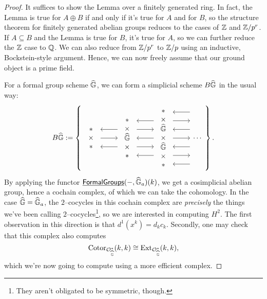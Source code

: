 \begin{proof}
It suffices to show the Lemma over a finitely generated ring.  In fact, the Lemma is true for $A \oplus B$ if and only if it's true for $A$ and for $B$, so the structure theorem for finitely generated abelian groups reduces to the cases of $\mathbb Z$ and $\mathbb Z/p^r$.  If $A \subseteq B$ and the Lemma is true for $B$, it's true for $A$, so we can further reduce the $\mathbb Z$ case to $\mathbb{Q}$.  We can also reduce from $\mathbb Z/p^r$ to $\mathbb Z/p$ using an inductive, Bockstein-style argument.  Hence, we can now freely assume that our ground object is a prime field.

For a formal group scheme $\widehat{\mathbb G}$, we can form a simplicial scheme $B\widehat{\mathbb G}$ in the usual way:
\[B\G := \left\{
\begin{tikzcd}[ampersand replacement=\&]
\begin{array}{c} * \\ \times \\ * \end{array} \arrow{r} \arrow[leftarrow,shift left=\baselineskip]{r} \arrow[leftarrow,shift right=\baselineskip]{r} \&
\begin{array}{c} * \\ \times \\ \G \\ \times \\ * \end{array} \arrow[leftarrow, shift left=(2*\baselineskip)]{r} \arrow[shift left=\baselineskip]{r} \arrow[leftarrow]{r} \arrow[shift right=\baselineskip]{r} \arrow[leftarrow, shift right=(2*\baselineskip)]{r} \&
\begin{array}{c} * \\ \times \\ \G \\ \times \\ \G \\ \times \\ *\end{array} \arrow[leftarrow, shift left=(3*\baselineskip)]{r} \arrow[shift left=(2*\baselineskip)]{r} \arrow[leftarrow, shift left=\baselineskip]{r} \arrow{r} \arrow[leftarrow, shift right=\baselineskip]{r} \arrow[shift right=(2*\baselineskip)]{r} \arrow[leftarrow, shift right=(3*\baselineskip)]{r} \&
\cdots
\end{tikzcd}
\right\}.\]
By applying the functor $\operatorname{\underline{\smash{\mathsf{FormalGroups}}}}(-, \widehat{\mathbb G}_a)(k)$, we get a cosimplicial abelian group, hence a cochain complex, of which we can take the cohomology.  In the case $\widehat{\mathbb G} = \widehat{\mathbb G}_a$, the $2$--cocycles in this cochain complex are \emph{precisely} the things we've been calling $2$--cocycles\footnote{They aren't obligated to be symmetric, though.}, so we are interested in computing $H^2$.  The first observation in this direction is that $d^1(x^k) = d_k c_k$.  Secondly, one may check that this complex also computes \[\operatorname{Cotor}_{\mathcal{O}_{\widehat{\mathbb G}}^*}(k, k) \cong \operatorname{Ext}_{\mathcal{O}_{\widehat{\mathbb G}}^*}(k, k),\] which we're now going to compute using a more efficient complex.


\end{proof}
